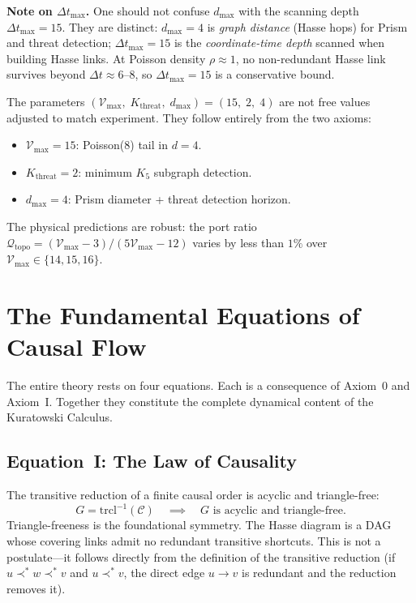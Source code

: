 \documentclass[11pt, a4paper, openany]{book}
\newcommand{\covers}{\prec^*}              %
\begin{document}
\medskip\noindent
\textbf{Note on $\Delta t_{\max}$.} One should not confuse $d_{\max}$
with the scanning depth $\Delta t_{\max} = 15$. They are distinct:
$d_{\max} = 4$ is \emph{graph distance} (Hasse hops) for Prism and
threat detection; $\Delta t_{\max} = 15$ is the \emph{coordinate-time
depth} scanned when building Hasse links. At Poisson density
$\rho \approx 1$, no non-redundant Hasse link survives beyond
$\Delta t \approx 6$--$8$, so $\Delta t_{\max} = 15$ is a
conservative bound.

\begin{tcolorbox}[colback=fourthlight,colframe=fourth,title={Three Constants: All Derived{,} None Fitted}]
The parameters $(\mathcal{V}_{\max},\; K_{\mathrm{threat}},\;
d_{\max}) = (15,\; 2,\; 4)$ are not free values adjusted to match
experiment. They follow entirely from the two axioms:
\begin{itemize}
  \item $\mathcal{V}_{\max} = 15$: Poisson($8$) tail in $d = 4$.
  \item $K_{\mathrm{threat}} = 2$: minimum $K_5$ subgraph detection.
  \item $d_{\max} = 4$: Prism diameter + threat detection horizon.
\end{itemize}
The physical predictions are robust: the port ratio
$\mathcal{Q}_{\mathrm{topo}} = (\mathcal{V}_{\max} - 3) /
(5\mathcal{V}_{\max} - 12)$ varies by less than $1\%$ over
$\mathcal{V}_{\max} \in \{14, 15, 16\}$.
\end{tcolorbox}

\section{The Fundamental Equations of Causal Flow}\label{sec:fundamental-equations}

The entire theory rests on four equations. Each is a consequence of
Axiom~0 and Axiom~I. Together they constitute the complete dynamical
content of the Kuratowski Calculus.

\subsection{Equation~I: The Law of Causality}

The transitive reduction of a finite causal order is acyclic and
triangle-free:
\begin{equation}\label{eq:law-of-causality}
  G = \mathrm{trcl}^{-1}(\mathcal{C})
  \quad\implies\quad
  G \text{ is acyclic and triangle-free.}
\end{equation}
Triangle-freeness is the foundational symmetry. The Hasse diagram is a
DAG whose covering links admit no redundant transitive shortcuts. This
is not a postulate---it follows directly from the definition of the
transitive reduction (if $u \covers w \covers v$ and $u \covers v$, the
direct edge $u \to v$ is redundant and the reduction removes it).
\end{document}
